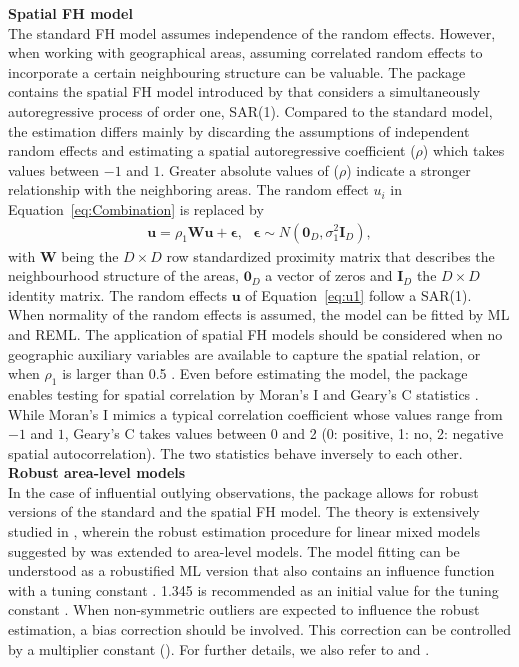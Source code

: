 \textbf{Spatial FH model} \\
The standard FH model assumes independence of the random effects. However, when working
with geographical areas, assuming correlated random effects to incorporate a
certain neighbouring structure can be valuable. The  package contains
the spatial FH model introduced by \citet{Petrucci2006} that considers a
simultaneously autoregressive process of order one, SAR(1). Compared to the
standard model, the estimation differs mainly by discarding the assumptions of
independent random effects and estimating a spatial autoregressive coefficient
($\rho$) which takes values between $-1$ and $1$. Greater absolute values of ($\rho$) indicate a stronger relationship with the neighboring areas. The random effect $u_i$
in Equation~\ref{eq:Combination} is replaced by
\begin{align}
\boldsymbol{u} = \rho_1 \boldsymbol{W} \boldsymbol{u} + \boldsymbol{\epsilon},
\text{   } \boldsymbol{\epsilon} \sim
N\left(\boldsymbol{0}_D,\sigma_{1}^2 \boldsymbol{I}_D\right),
\label{eq:u1}
\end{align}
with $\boldsymbol{W}$ being the $D \times D$ row standardized proximity matrix
that describes the neighbourhood structure of the areas, $\boldsymbol{0}_D$ a
vector of zeros and $\boldsymbol{I}_D$ the $D \times D$ identity matrix. The
random effects $\boldsymbol{u}$ of Equation~\ref{eq:u1} follow a SAR(1). When
normality of the random effects is assumed, the model can be fitted by ML and
REML. The application of spatial FH models should
be considered when no geographic auxiliary variables are available to capture
the spatial relation, or when $\rho_1$ is larger than 0.5 \citep{Bertarelli2019}.
Even before estimating the model, the  package enables testing for
spatial correlation by Moran's I and Geary's C statistics
\citep{Cliff1981, Pratesi2008}. While Moran's I mimics a typical correlation
coefficient whose values range from $-1$ and $1$, Geary's C takes values between
0 and 2 (0: positive, 1: no, 2: negative spatial autocorrelation). The two statistics
behave inversely to each other. \\

\textbf{Robust area-level models} \\
In the case of influential outlying observations, the  package allows for
robust versions of the standard and the spatial FH model. The theory is extensively
studied in \citet{Warnholz2016}, wherein the robust estimation procedure for linear mixed models suggested by \citet{Sinha2009} was extended to area-level models. The model
fitting can be understood as a robustified ML version that also contains an influence
function with a tuning constant . 1.345 is recommended as an initial value for the tuning constant \citep{Sinha2009}. When non-symmetric outliers are
expected to influence the robust estimation, a bias correction should be involved.
This correction can be controlled by a multiplier constant (). For further details, we also refer to
\citet{Chambers2014} and \citet{Schmid2016}. \\

